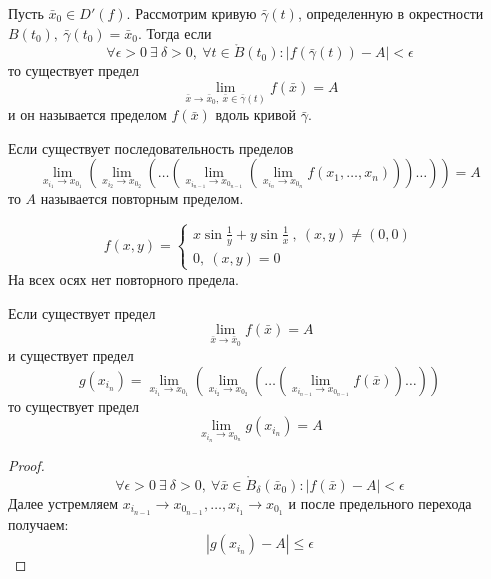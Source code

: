 \begin{definition}
    Пусть $\bar{x}_0\in D'(f)$. Рассмотрим кривую $\bar{\gamma}(t)$, определенную в окрестности $B(t_0),\ \bar{\gamma}(t_0)=\bar{x}_0$. Тогда если 
    \[\forall \epsilon>0\ \exists\ \delta>0,\ \forall t\in \mathring{B}(t_0): |f(\bar{\gamma}(t))-A|<\epsilon\]
    то существует предел 
    \[\lim\limits_{\bar{x}\to \bar{x}_0,\ \bar{x}\in \bar{\gamma}(t)}f(\bar{x})=A\]
    и он называется пределом $f(\bar{x})$ вдоль кривой $\bar{\gamma}$.
\end{definition} 
\begin{definition}
    Если существует последовательность пределов
    \[\lim\limits_{x_{i_1}\to x_{0_1}}(\lim\limits_{x_{i_2}\to x_{0_2}}(\dots(\lim\limits_{x_{i_{n-1}}\to x_{0_{n-1}}}(\lim\limits_{x_{i_n}\to x_{0_n}}f(x_1,\dots,x_n)))\dots))=A\]
    то $A$ называется повторным пределом. 
\end{definition} 
\begin{example}
    \[f(x,y)=\begin{cases}
        x\sin{\frac{1}{y}+y\sin{\frac{1}{x}}}\ ,\ (x,y)\ne (0,0)\\
        0,\ (x, y)=0
    \end{cases}
    \]
    На всех осях нет повторного предела.
\end{example}
\begin{theorem}
    Если существует предел
    \[\lim\limits_{\bar{x}\to \bar{x}_0}f(\bar{x})=A\]
    и существует предел
    \[g(x_{i_n})=\lim\limits_{x_{i_1}\to x_{0_1}}(\lim\limits_{x_{i_2}\to x_{0_2}}(\dots(\lim\limits_{x_{i_{n-1}}\to x_{0_{n-1}}}f(\bar{x}))\dots))\]
    то существует предел
    \[\lim\limits_{x_{i_n}\to x_{0_n}}g(x_{i_n})=A\]
\end{theorem} 
\begin{proof}
    \[\forall \epsilon>0\ \exists\ \delta>0,\ \forall \bar{x}\in \mathring{B}_{\delta}(\bar{x}_0): |f(\bar{x})-A|<\epsilon\]
    Далее устремляем $x_{i_{n-1}}\to x_{0_{n-1}}, \dots, x_{i_1}\to x_{0_1}$ и после предельного перехода получаем:
    \[|g(x_{i_n})-A|\leq \epsilon\]
\end{proof} 
